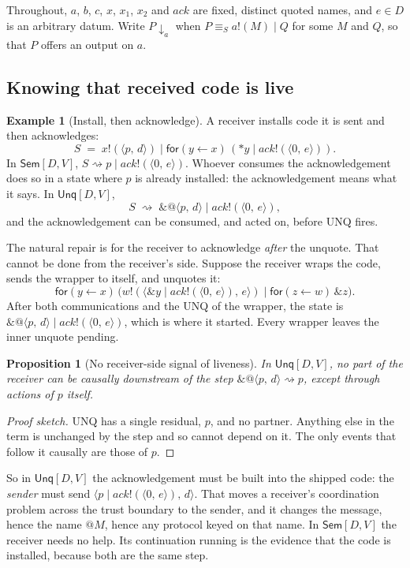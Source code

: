 \documentclass[11pt,a4paper]{article}
\makeatletter
\theoremstyle{plain}
\newtheorem{proposition}[theorem]{Proposition}
\theoremstyle{definition}
\newtheorem{example}[theorem]{Example}
\theoremstyle{remark}
\newcommand{\pr}[2]{\langle #1,\,#2\rangle}
\newcommand{\qn}[2]{@\langle #1,\,#2\rangle}
\newcommand{\out}[2]{#1!(#2)}
\newcommand{\rcv}[3]{\mathsf{for}(#1 \leftarrow #2)\,#3}
\newcommand{\drop}[1]{{*}#1}
\newcommand{\unq}[1]{\mathop{\&}#1}
\newcommand{\red}{\rightsquigarrow}
\newcommand{\scong}{\equiv_{S}}
\newcommand{\Sem}{\textsf{Sem}[D,V]}
\newcommand{\Unq}{\textsf{Unq}[D,V]}
\newcommand{\barb}[1]{\mathop{\downarrow}_{#1}}
\makeatother
\begin{document}
Throughout, $a$, $b$, $c$, $x$, $x_1$, $x_2$ and $\mathit{ack}$ are fixed,
distinct quoted names, and $e\in D$ is an arbitrary datum. Write $P\barb{a}$ when
$P\scong\out{a}{M}\mid Q$ for some $M$ and $Q$, so that $P$ offers an output
on $a$.

\subsection{Knowing that received code is live}

\begin{example}[Install, then acknowledge]\label{ex:ack}
A receiver installs code it is sent and then acknowledges:
\[
  S \;=\; \out{x}{\pr{p}{d}}\mid
         \rcv{y}{x}{(\drop{y}\mid\out{\mathit{ack}}{\pr{0}{e}})}.
\]
In $\Sem$,
$S\red p\mid\out{\mathit{ack}}{\pr{0}{e}}$. Whoever consumes the
acknowledgement does so in a state where $p$ is already installed: the
acknowledgement means what it says. In $\Unq$,
\[
  S \;\red\; \unq{\qn{p}{d}}\mid\out{\mathit{ack}}{\pr{0}{e}},
\]
and the acknowledgement can be consumed, and acted on, before UNQ fires.
\end{example}

The natural repair is for the receiver to acknowledge \emph{after} the
unquote. That cannot be done from the receiver's side. Suppose the receiver
wraps the code, sends the wrapper to itself, and unquotes it:
\[
  \rcv{y}{x}{\big(\out{w}{\pr{\unq{y}\mid\out{\mathit{ack}}{\pr{0}{e}}}{e}}
     \mid\rcv{z}{w}{\unq{z}}\big)}.
\]
After both communications and the UNQ of the wrapper, the state is
$\unq{\qn{p}{d}}\mid\out{\mathit{ack}}{\pr{0}{e}}$, which is where it started.
Every wrapper leaves the inner unquote pending.

\begin{proposition}[No receiver-side signal of liveness]\label{prop:noack}
In $\Unq$, no part of the receiver can be causally downstream of the step
$\unq{\qn{p}{d}}\red p$, except through actions of $p$ itself.
\end{proposition}

\begin{proof}[Proof sketch]
UNQ has a single residual, $p$, and no partner. Anything else in the term is
unchanged by the step and so cannot depend on it. The only events that follow
it causally are those of $p$.
\end{proof}

So in $\Unq$ the acknowledgement must be built into the shipped code: the
\emph{sender} must send $\pr{p\mid\out{\mathit{ack}}{\pr{0}{e}}}{d}$. That moves
a receiver's coordination problem across the trust boundary to the sender,
and it changes the message, hence the name $@M$, hence any protocol keyed on
that name. In $\Sem$ the receiver needs no help. Its continuation running is
the evidence that the code is installed, because both are the same step.
\end{document}
